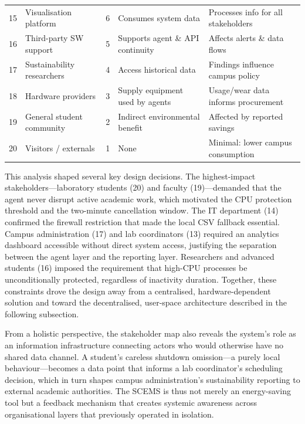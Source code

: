 \documentclass[conference]{IEEEtran}
\begin{document}
\begin{table}[t]
\begin{tabular}{p{0.3cm} p{2.5cm} p{0.3cm} p{1.8cm} p{1.8cm}}
15 & Visualisation platform    &  6 & Consumes system data                 & Processes info for all stakeholders \\
16 & Third-party SW support    &  5 & Supports agent \& API continuity     & Affects alerts \& data flows \\
17 & Sustainability researchers &  4 & Access historical data               & Findings influence campus policy \\
18 & Hardware providers        &  3 & Supply equipment used by agents      & Usage/wear data informs procurement \\
19 & General student community &  2 & Indirect environmental benefit       & Affected by reported savings \\
20 & Visitors / externals      &  1 & None                                 & Minimal: lower campus consumption \\
\bottomrule
\end{tabular}
\end{table}

This analysis shaped several key design decisions. The highest-impact stakeholders—laboratory students (20) and faculty (19)—demanded that the agent never disrupt active academic work, which motivated the CPU protection threshold and the two-minute cancellation window. The IT department (14) confirmed the firewall restriction that made the local CSV fallback essential. Campus administration (17) and lab coordinators (13) required an analytics dashboard accessible without direct system access, justifying the separation between the agent layer and the reporting layer. Researchers and advanced students (16) imposed the requirement that high-CPU processes be unconditionally protected, regardless of inactivity duration. Together, these constraints drove the design away from a centralised, hardware-dependent solution and toward the decentralised, user-space architecture described in the following subsection.

From a holistic perspective, the stakeholder map also reveals the system's role as an information infrastructure connecting actors who would otherwise have no shared data channel. A student's careless shutdown omission—a purely local behaviour—becomes a data point that informs a lab coordinator's scheduling decision, which in turn shapes campus administration's sustainability reporting to external academic authorities. The SCEMS is thus not merely an energy-saving tool but a feedback mechanism that creates systemic awareness across organisational layers that previously operated in isolation.
\end{document}
